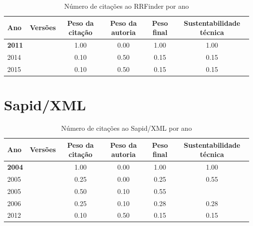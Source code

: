 \begin{table}[H]
\caption{Número de citações ao RRFinder por ano}
\centering
\begin{tabular}{| l | c | c | c | c | c |}
  \hline
  Ano & Versões & Peso da citação & Peso da autoria & Peso final & Sustentabilidade técnica \\
  \hline
            {\bf 2011}
          &
          
          &
          1.00
          &
          0.00
          &
          1.00
          &
            {\color{blue} 1.00}
          \\
\hline
            2014
          &
          
          &
          0.10
          &
          0.50
          &
          0.15
          &
            {\color{red} 0.15}
          \\
\hline
            2015
          &
          
          &
          0.10
          &
          0.50
          &
          0.15
          &
            {\color{red} 0.15}
          \\
\hline
\end{tabular}
\end{table}



\section{Sapid/XML}


\begin{table}[H]
\caption{Número de citações ao Sapid/XML por ano}
\centering
\begin{tabular}{| l | c | c | c | c | c |}
  \hline
  Ano & Versões & Peso da citação & Peso da autoria & Peso final & Sustentabilidade técnica \\
  \hline
            {\bf 2004}
          &
          
          &
          1.00
          &
          0.00
          &
          1.00
          &
            {\color{blue} 1.00}
          \\
\hline
            2005
          &
          
          &
          0.25
          &
          0.00
          &
          0.25
          &
            {\color{blue} 0.55}
          \\
            2005
          &
          
          &
          0.50
          &
          0.10
          &
          0.55
          &
          \\
\hline
            2006
          &
          
          &
          0.25
          &
          0.10
          &
          0.28
          &
            {\color{red} 0.28}
          \\
\hline
            2012
          &
          
          &
          0.10
          &
          0.50
          &
          0.15
          &
            {\color{red} 0.15}
          \\
\hline
\end{tabular}
\end{table}




